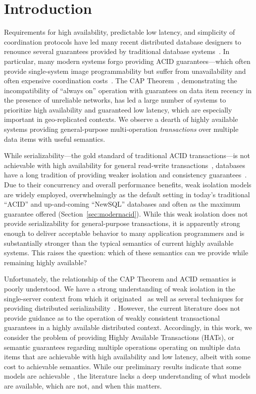 

\section{Introduction}

Requirements for high availability, predictable low latency, and
simplicity of coordination protocols have led many recent distributed
database designers to renounce several guarantees provided by
traditional database systems~\cite{bigtable, pnuts, dynamo}. In
particular, many modern systems forgo providing ACID
guarantees---which often provide single-system image programmability
but suffer from unavailability and often expensive coordination
costs~\cite{davidson-survey}. The CAP Theorem~\cite{gilbert-cap},
demonstrating the incompatibility of ``always on'' operation with
guarantees on data item recency in the presence of unreliable
networks, has led a large number of systems to prioritize high
availability and guaranteed low latency, which are especially
important in geo-replicated contexts. We observe a dearth of highly
available systems providing general-purpose multi-operation
\textit{transactions} over multiple data items with useful semantics.

While serializability---the gold standard of traditional ACID
transactions---is not achievable with high availability for general
read-write transactions~\cite{davidson-survey}, databases have a long
tradition of providing weaker isolation and consistency
guarantees~\cite{adya, ansicritique, gray-isolation}. Due to their
concurrency and overall performance benefits, weak isolation models
are widely employed, overwhelmingly as the default setting in today's
traditional ``ACID'' and up-and-coming ``NewSQL'' databases and often
as the maximum guarantee offered (Section~\ref{sec:modernacid}). While
this weak isolation does not provide serializability for
general-purpose transactions, it is apparently strong enough to
deliver acceptable behavior to many application programmers and is
substantially stronger than the typical semantics of current highly
available systems. This raises the question: which of these semantics
can we provide while remaining highly available?

Unfortunately, the relationship of the CAP Theorem and ACID semantics
is poorly understood. We have a strong understanding of weak isolation
in the single-server context from which it originated~\cite{adya,
  ansicritique, gray-isolation} as well as several techniques for
providing distributed
serializability~\cite{bernstein-concurrency}. However, the current
literature does not provide guidance as to the operation of weakly
consistent transactional guarantees in a highly available distributed
context. Accordingly, in this work, we consider the problem of
providing Highly Available Transactions (HATs), or semantic guarantees
regarding multiple operations operating on multiple data items that
are achievable with high availability and low latency, albeit with
some cost to achievable semantics. While our preliminary results
indicate that some models are achievable~\cite{hat-hotos}, the
literature lacks a deep understanding of what models are available,
which are not, and when this matters.


